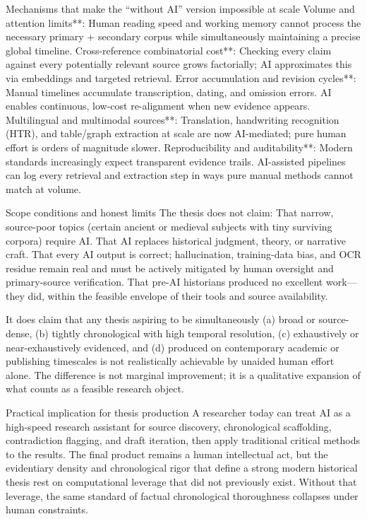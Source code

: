 Mechanisms that make the “without AI” version impossible at scale
Volume and attention limits**: Human reading speed and working memory cannot process the necessary primary + secondary corpus while simultaneously maintaining a precise global timeline.
Cross-reference combinatorial cost**: Checking every claim against every potentially relevant source grows factorially; AI approximates this via embeddings and targeted retrieval.
Error accumulation and revision cycles**: Manual timelines accumulate transcription, dating, and omission errors. AI enables continuous, low-cost re-alignment when new evidence appears.
Multilingual and multimodal sources**: Translation, handwriting recognition (HTR), and table/graph extraction at scale are now AI-mediated; pure human effort is orders of magnitude slower.
Reproducibility and auditability**: Modern standards increasingly expect transparent evidence trails. AI-assisted pipelines can log every retrieval and extraction step in ways pure manual methods cannot match at volume.

Scope conditions and honest limits
The thesis does not claim:
That narrow, source-poor topics (certain ancient or medieval subjects with tiny surviving corpora) require AI.
That AI replaces historical judgment, theory, or narrative craft.
That every AI output is correct; hallucination, training-data bias, and OCR residue remain real and must be actively mitigated by human oversight and primary-source verification.
That pre-AI historians produced no excellent work—they did, within the feasible envelope of their tools and source availability.

It does claim that any thesis aspiring to be simultaneously (a) broad or source-dense, (b) tightly chronological with high temporal resolution, (c) exhaustively or near-exhaustively evidenced, and (d) produced on contemporary academic or publishing timescales is not realistically achievable by unaided human effort alone. The difference is not marginal improvement; it is a qualitative expansion of what counts as a feasible research object.

Practical implication for thesis production
A researcher today can treat AI as a high-speed research assistant for source discovery, chronological scaffolding, contradiction flagging, and draft iteration, then apply traditional critical methods to the results. The final product remains a human intellectual act, but the evidentiary density and chronological rigor that define a strong modern historical thesis rest on computational leverage that did not previously exist. Without that leverage, the same standard of factual chronological thoroughness collapses under human constraints.


